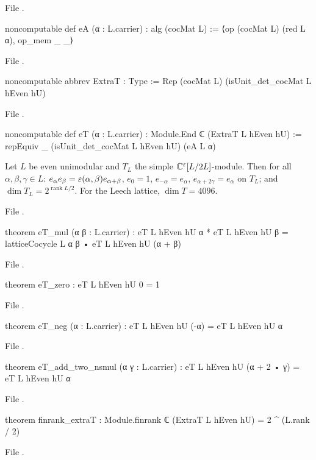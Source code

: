 \noindent File .
\begin{leancode}
noncomputable def eA (α : L.carrier) : alg (cocMat L) := ⟨op (cocMat L) (red L α), op_mem _ _⟩
\end{leancode}
\noindent File .
\begin{leancode}
noncomputable abbrev ExtraT : Type := Rep (cocMat L) (isUnit_det_cocMat L hEven hU)
\end{leancode}
\noindent File .
\begin{leancode}
noncomputable def eT (α : L.carrier) : Module.End ℂ (ExtraT L hEven hU) :=
  repEquiv _ (isUnit_det_cocMat L hEven hU) (eA L α)
\end{leancode}
\begin{theorem}\label{ch06:thm:eT}
Let $L$ be even unimodular and $T_L$ the simple ${\mathbb{C}}^\varepsilon[L/2L]$-module.  Then for all
$\alpha,\beta,\gamma\in L$:
$e_\alpha e_\beta=\varepsilon(\alpha,\beta)e_{\alpha+\beta}$, $e_0=1$, $e_{-\alpha}=e_\alpha$,
$e_{\alpha+2\gamma}=e_\alpha$ on $T_L$; and $\dim T_L=2^{\operatorname{rank}L/2}$.  For the Leech
lattice, $\dim T=4096$.
\end{theorem}
\noindent File .
\begin{leancode}
theorem eT_mul (α β : L.carrier) :
    eT L hEven hU α * eT L hEven hU β = latticeCocycle L α β • eT L hEven hU (α + β)
\end{leancode}
\noindent File .
\begin{leancode}
theorem eT_zero : eT L hEven hU 0 = 1
\end{leancode}
\noindent File .
\begin{leancode}
theorem eT_neg (α : L.carrier) : eT L hEven hU (-α) = eT L hEven hU α
\end{leancode}
\noindent File .
\begin{leancode}
theorem eT_add_two_nsmul (α γ : L.carrier) : eT L hEven hU (α + 2 • γ) = eT L hEven hU α
\end{leancode}
\noindent File .
\begin{leancode}
theorem finrank_extraT : Module.finrank ℂ (ExtraT L hEven hU) = 2 ^ (L.rank / 2)
\end{leancode}
\noindent File .
